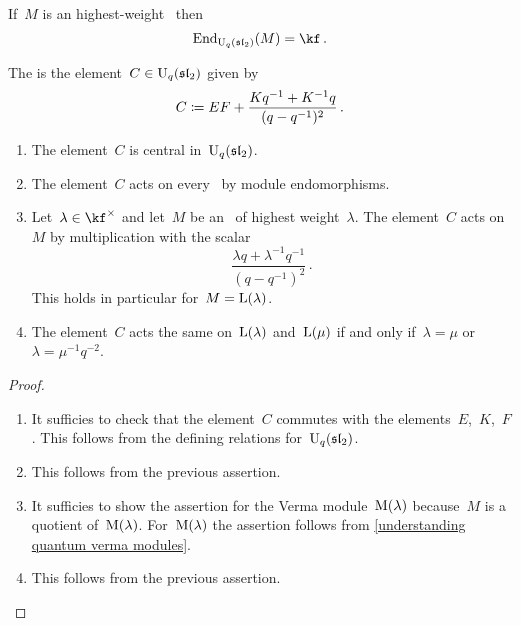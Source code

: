\documentclass[a4paper, 11pt, oneside]{scrartcl}
\begin{document}
\begin{lemma}
  \label{endomorphism of highest weight is ground field}
  If~$M$ is an highest-weight~ then
  \[
    \End_{\Univ_q(\sllie_2)}(M) = \kf \,.
  \]
\end{lemma}

\begin{definition}
  The  is the element~$C \in \operatorname{U}_q(\mathfrak{sl}_2)$ given by
  \[
    C
    \coloneqq
    EF + \frac{ K q^{-1} + K^{-1} q }{ (q - q^{-1})^2 } \,.
  \]
\end{definition}

\begin{lemma}
  \label{action of the quantum casimir element}
  \leavevmode
  \begin{enumerate}
    \item
      The element~$C$ is central in~$\operatorname{U}_q(\mathfrak{sl}_2)$.
    \item
      The element~$C$ acts on every~ by module endomorphisms.
    \item
      Let~$\lambda \in \kf^\times$ and let~$M$ be an~ of highest weight~$\lambda$.
      The element~$C$ acts on~$M$ by multiplication with the scalar
      \[
        \frac{\lambda q + \lambda^{-1} q^{-1}}{ (q - q^{-1})^2 } \,.
      \]
      This holds in particular for~$M = \operatorname{L}(\lambda)$.
    \item
      The element~$C$ acts the same on~$\operatorname{L}(\lambda)$ and~$\operatorname{L}(\mu)$ if and only if~$\lambda = \mu$ or~$\lambda = \mu^{-1} q^{-2}$.
  \end{enumerate}
\end{lemma}

\begin{proof}
  \leavevmode
  \begin{enumerate}
    \item
      It sufficies to check that the element~$C$ commutes with the elements~$E$,~$K$,~$F$.
      This follows from the defining relations for~$\operatorname{U}_q(\mathfrak{sl}_2)$.
    \item
      This follows from the previous assertion.
    \item
      It sufficies to show the assertion for the Verma module~$\operatorname{M}(\lambda)$ because~$M$ is a quotient of~$\operatorname{M}(\lambda)$.
      For~$\operatorname{M}(\lambda)$ the assertion follows from \cref{understanding quantum verma modules}.
    \item
      This follows from the previous assertion.
    \qedhere
  \end{enumerate}
\end{proof}
\end{document}
